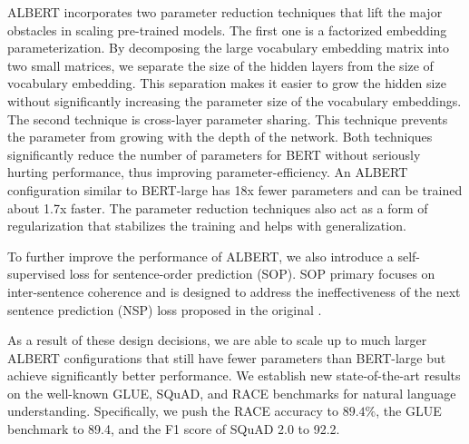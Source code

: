 ALBERT incorporates two parameter reduction techniques that lift the major obstacles in scaling pre-trained models.
The first one is a factorized embedding parameterization.
By decomposing the large vocabulary embedding matrix into two small matrices, we separate the size of the hidden layers from the size of vocabulary embedding.
This separation makes it easier to grow the hidden size without significantly increasing the parameter size of the vocabulary embeddings.
The second technique is cross-layer parameter sharing.
This technique prevents the parameter from growing with the depth of the network.
Both techniques significantly reduce the number of parameters for BERT without seriously hurting performance, thus improving  parameter-efficiency.
An ALBERT configuration similar to BERT-large has 18x fewer parameters and can be trained about 1.7x faster.
The parameter reduction techniques also act as a form of regularization that stabilizes the training and helps with generalization. 

To further improve the performance of ALBERT, we also introduce a self-supervised loss for sentence-order prediction (SOP). SOP primary focuses on inter-sentence coherence and is designed to address the ineffectiveness \citep{yang2019xlnet, liu2019roberta} of the next sentence prediction (NSP) loss proposed in the original \bert. 


As a result of these design decisions, we are able to scale up to much larger ALBERT configurations that still have fewer parameters than BERT-large but achieve significantly better performance.
We establish new state-of-the-art results on the well-known GLUE, SQuAD, and RACE benchmarks for natural language understanding.
Specifically, we push the RACE accuracy to $89.4\%$, the GLUE benchmark to 89.4,  and the F1 score of SQuAD 2.0 to 92.2.


